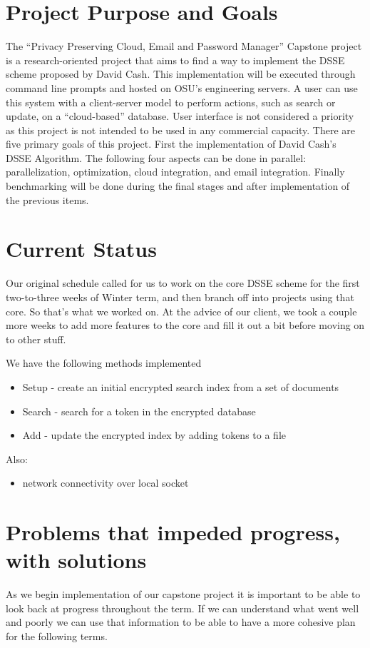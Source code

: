 \documentclass[onecolumn, draftclsnofoot,10pt, compsoc]{IEEEtran}
\begin{document}
\section{Project Purpose and Goals}
The ``Privacy Preserving Cloud, Email and Password Manager'' Capstone project is a research-oriented project that aims
to find a way to implement the DSSE scheme proposed by David Cash. This implementation will be executed through command line prompts and hosted on OSU’s engineering servers. A user can use this system with a client-server model to perform actions, such as search or update, on a ``cloud-based'' database. User interface is not considered a priority as this project is not intended to be used in any commercial capacity. There are five primary goals of this project. First the implementation of David Cash's DSSE Algorithm. The following four aspects can be done in parallel: parallelization, optimization, cloud integration, and email integration. Finally benchmarking will be done during the final stages and after implementation of the previous items.


\section{Current Status}
Our original schedule called for us to work on the core DSSE scheme for the first two-to-three weeks of Winter term, and then branch off into projects using that core.
So that's what we worked on.
At the advice of our client, we took a couple more weeks to add more features to the core and fill it out a bit before moving on to other stuff.

We have the following methods implemented
\begin{itemize}
\item Setup - create an initial encrypted search index from a set of documents
\item Search - search for a token in the encrypted database
\item Add - update the encrypted index by adding tokens to a file
\end{itemize}

Also:
\begin{itemize}
\item network connectivity over local socket
\end{itemize}

\section{Problems that impeded progress, with solutions}
As we begin implementation of our capstone project it is important to be able to look back at progress throughout the term. If we can understand what went well and poorly we can use that information to be able to have a more cohesive plan for the following terms.
\end{document}
